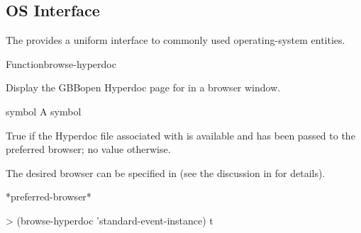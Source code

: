 \documentclass[10pt,twoside,english,pdftex]{article}
\begin{document}

\T\markright{}%
\T\pagestyle{plain}
\T\clearpage
\W{}
\T\pagestyle{fancy}
\T\thispagestyle{fancybottom}
\T\global\def\fnlastname{ }%
\subsection{OS Interface}
\label{sec:os-interface}%

%
%
%
The   provides a uniform interface to
commonly used operating-system entities.

\W\entities
\T\clearpage


\begin{functiondoc}{Function}{browse-hyperdoc}{
  \returns{} } 
%
%
%

\fnsyntax

\fnpurpose Display the GBBopen Hyperdoc page for  in a
browser window.

\fnpackage {}

\fnmodule {}

\fnargs
\begin{args}{symbol}
\arg[symbol] A symbol
\end{args}

\fnreturns True if the Hyperdoc file associated with  is
available and has been passed to the preferred browser; no value otherwise.

%
\fndescription The desired browser can be specified in
 (see the discussion in  for details).

\begin{alsos}{*preferred-browser*}
\end{alsos}

\fnexample
%
\W\supp
\begin{example}
> (browse-hyperdoc 'standard-event-instance)
t
\end{example}

\end{functiondoc}
\end{document}
